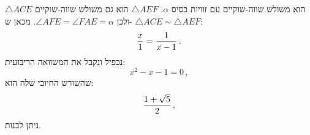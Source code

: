 %
%
%
%
%
%
$\triangle ACE$ 
הוא משולש שווה-שוקיים עם זוויות בסיס
$\alpha$. $\triangle AEF$
הוא גם משולש שווה-שוקיים ולכן
$\angle AFE=\angle FAE=\alpha$.
מכאן ש-%
$\triangle ACE\sim\triangle AEF$:
\[
\displaystyle\frac{x}{1}=\displaystyle\frac{1}{x-1}\,.
\]
נכפיל ונקבל את המשוואה הריבועית:
\[
x^2-x-1=0\,,
\]
שהשורש החיובי שלה הוא:
\[
\displaystyle\frac{1+\sqrt{5}}{2}\,,
\]
ניתן לבנות.

